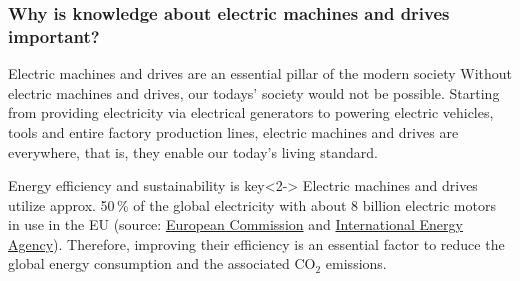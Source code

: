 \begin{frame}
	\frametitle{Why is knowledge about electric machines and drives important?}
	\begin{varblock}{Electric machines and drives are an essential pillar of the modern society}
		Without electric machines and drives, our todays' society would not be possible. Starting from providing electricity via electrical generators to powering electric vehicles, tools and entire factory production lines, electric machines and drives are everywhere, that is, they enable our today's living standard. 
	\end{varblock}
	\begin{varblock}{Energy efficiency and sustainability is key}<2->
		Electric machines and drives utilize  approx. 50\,\% of the global electricity with about 8 billion electric motors in use in the EU (source: \href{https://commission.europa.eu/energy-climate-change-environment/standards-tools-and-labels/products-labelling-rules-and-requirements/energy-label-and-ecodesign/energy-efficient-products/electric-motors-and-variable-speed-drives_en}{European Commission} and \href{https://iea.blob.core.windows.net/assets/d69b2a76-feb9-4a74-a921-2490a8fefcdf/EE_for_ElectricSystems.pdf}{International Energy Agency}). Therefore, improving their efficiency is an essential factor to reduce the global energy consumption and the associated CO$_2$ emissions.
	\end{varblock}
\end{frame}

